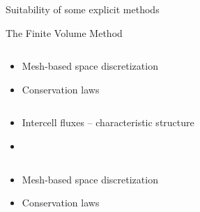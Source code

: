 \begin{withoutheadline}
  \begin{frame}{Suitability of some explicit methods}
   
    \begin{block}{The Finite Volume Method \cite{Leveque}}
      \vspace{-0.2cm}
      \begin{overprint}
        \vspace{-0.2cm}
        \begin{columns}
          \begin{footnotesize}
            \begin{column}{0.4\textwidth}
              \begin{itemize}
              \item[] Mesh-based space discretization
              \item[] Conservation laws
              \end{itemize}
            \end{column}
            \begin{column}{0.6\textwidth}
              \begin{itemize}
              \item[] Intercell fluxes -- characteristic structure \cite{Godunov_method}
              \item[] %
              \end{itemize}
            \end{column}
          \end{footnotesize}
        \end{columns}
        \vspace{3.65cm}
        \vspace{-0.2cm}
        \begin{columns}
          \begin{footnotesize}
            \begin{column}{0.4\textwidth}
              \begin{itemize}
              \item[] Mesh-based space discretization
              \item[] Conservation laws
              \end{itemize}
            \end{column}
            \begin{column}{0.6\textwidth}

\end{column}
\end{footnotesize}
\end{columns}
\end{overprint}
\end{block}
\end{frame}
\end{withoutheadline}

